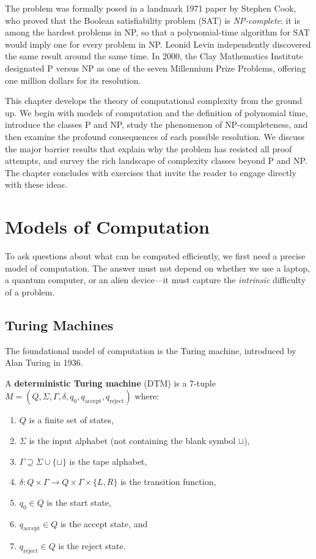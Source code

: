 The problem was formally posed in a landmark 1971 paper by Stephen Cook, who proved that the Boolean satisfiability problem (SAT) is \emph{NP-complete}: it is among the hardest problems in NP, so that a polynomial-time algorithm for SAT would imply one for every problem in NP. Leonid Levin independently discovered the same result around the same time. In 2000, the Clay Mathematics Institute designated P versus NP as one of the seven Millennium Prize Problems, offering one million dollars for its resolution.

This chapter develops the theory of computational complexity from the ground up. We begin with models of computation and the definition of polynomial time, introduce the classes P and NP, study the phenomenon of NP-completeness, and then examine the profound consequences of each possible resolution. We discuss the major barrier results that explain why the problem has resisted all proof attempts, and survey the rich landscape of complexity classes beyond P and NP. The chapter concludes with exercises that invite the reader to engage directly with these ideas.

\section{Models of Computation}

To ask questions about what can be computed efficiently, we first need a precise model of computation. The answer must not depend on whether we use a laptop, a quantum computer, or an alien device---it must capture the \emph{intrinsic} difficulty of a problem.

\subsection{Turing Machines}

The foundational model of computation is the Turing machine, introduced by Alan Turing in 1936.

\begin{definition}
A \textbf{deterministic Turing machine} (DTM) is a 7-tuple $M = (Q, \Sigma, \Gamma, \delta, q_0, q_{\text{accept}}, q_{\text{reject}})$ where:
\begin{enumerate}
  \item $Q$ is a finite set of states,
  \item $\Sigma$ is the input alphabet (not containing the blank symbol $\sqcup$),
  \item $\Gamma \supseteq \Sigma \cup \{\sqcup\}$ is the tape alphabet,
  \item $\delta: Q \times \Gamma \to Q \times \Gamma \times \{L, R\}$ is the transition function,
  \item $q_0 \in Q$ is the start state,
  \item $q_{\text{accept}} \in Q$ is the accept state, and
  \item $q_{\text{reject}} \in Q$ is the reject state.
\end{enumerate}
\end{definition}

